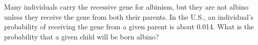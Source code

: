 Many individuals carry the recessive gene for albinism, but they are not
albino unless they receive the gene from both their parents. In the U.S., an individual's
probability of receiving the gene from a given parent is about 0.014. What is the probability
that a given child will be born albino?\answercheck
